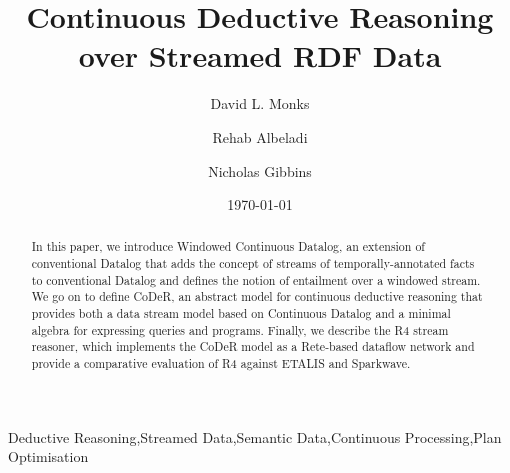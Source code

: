 \documentclass[twocolumn,preprint,3p,number]{elsarticle}
\theoremstyle{plain}
\theoremstyle{definition}
\begin{document}
\begin{frontmatter}
  \title{Continuous Deductive Reasoning over Streamed RDF Data}

  \author{David L. Monks}
  \author{Rehab Albeladi}
  \author{Nicholas Gibbins}
  \address{
            Electronics and Computer Science,\\
            University of Southampton,\\
            Southampton, SO17 1BJ,\\
            United Kingdom
  }

  \begin{abstract}
    In this paper, we introduce Windowed Continuous Datalog, an extension of
    conventional Datalog that adds the concept of streams of
    temporally-annotated facts to conventional Datalog and defines the
    notion of entailment over a windowed stream. We go on to define CoDeR,
    an abstract model for continuous deductive reasoning that provides
    both a data stream model based on Continuous Datalog and a minimal
    algebra for expressing queries and programs.  Finally, we describe the
    R4 stream reasoner, which implements the CoDeR model as a Rete-based
    dataflow network and provide a comparative evaluation of R4
    against ETALIS and Sparkwave.

  \end{abstract}

  \begin{keyword}
        Deductive Reasoning\sep Streamed Data\sep Semantic Data\sep Continuous Processing\sep Plan Optimisation
  \end{keyword}

  \date{\today}

\end{frontmatter}
\end{document}
